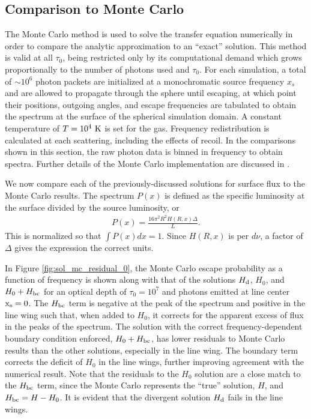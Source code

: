 \documentclass[linenumbers]{aastex63}
\newcommand{\be}{\begin{eqnarray}}
\newcommand{\ee}{\end{eqnarray}}
\begin{document}
\subsection{Comparison to Monte Carlo}
The Monte Carlo method is used to solve the transfer equation numerically in order to compare the analytic approximation to an ``exact'' solution. This method is valid at all $\tau_0$, being restricted only by its computational demand which grows proportionally to the number of photons used and $\tau_0$. For each simulation, a total of ${\sim}10^6$ photon packets are initialized at a monochromatic source frequency $x_s$ and are allowed to propagate through the sphere until escaping, at which point their positions, outgoing angles, and escape frequencies are tabulated to obtain the spectrum at the surface of the spherical simulation domain. A constant temperature of $T=10^4\ \rm K$ is set for the gas. Frequency redistribution is calculated at each scattering, including the effects of recoil. In the comparisons shown in this section, the raw photon data is binned in frequency to obtain spectra. Further details of the Monte Carlo implementation are discussed in \citet{2017ApJ...851..150H}.

We now compare each of the previously-discussed solutions for surface flux to the Monte Carlo results. The spectrum $P(x)$ is defined as the specific luminosity at the surface divided by the source luminosity, or
\be \label{eq:prob_spectrum}
P(x) = \frac{16\pi^2R^2H(R, x)\Delta}{L}.
\ee
This is normalized so that $\int P(x)dx = 1$. Since $H(R, x)$ is per $d\nu$, a factor of $\Delta$ gives the expression the correct units. 

In Figure \ref{fig:sol_mc_residual_0}, the Monte Carlo escape probability as a function of frequency is shown along with that of the solutions $H_{\rm d}$, $H_0$, and $H_0 + H_{\rm bc}$ for an optical depth of $\tau_0 = 10^7$ and photons emitted at line center $\rm x_s = 0$.  The $H_{\rm bc}$ term is negative at the peak of the spectrum and positive in the line wing such that, when added to $H_0$, it corrects for the apparent excess of flux in the peaks of the spectrum. The solution with the correct frequency-dependent boundary condition enforced, $H_0 + H_{\rm bc}$, has lower residuals to Monte Carlo results than the other solutions, especially in the line wing. The boundary term corrects the deficit of $H_0$ in the line wings, further improving agreement with the numerical result. Note that the residuals to the $H_0$ solution are a close match to the $H_{\rm bc}$ term, since the Monte Carlo represents the ``true'' solution, $H$, and $H_{\rm bc} = H - H_0$. It is evident that the divergent solution $H_{\rm d}$ fails in the line wings.
\end{document}
